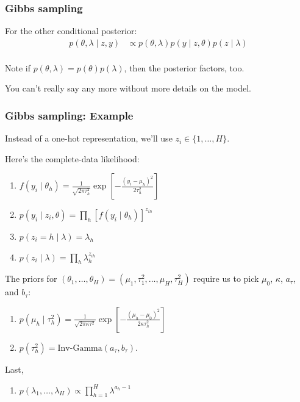 \documentclass{beamer}
\begin{document}
\begin{frame}
\frametitle{Gibbs sampling}

For the other conditional posterior:
\begin{align*}
p(\theta, \lambda \mid z, y) &\propto p(\theta, \lambda )p(y \mid z, \theta)p(z \mid \lambda) \\
\end{align*}

Note if $p(\theta, \lambda) = p(\theta)p(\lambda)$, then the posterior factors, too. 
\newline

You can't really say any more without more details on the model. 

\end{frame}

\begin{frame}
\frametitle{Gibbs sampling: Example}

Instead of a one-hot representation, we'll use $z_i \in \{1,\ldots,H\}$.
\newline
\pause



Here's the complete-data likelihood:

\begin{enumerate}
\item $f(y_i \mid \theta_h) = \frac{1}{\sqrt{2\pi \tau^2_{h} }}\exp\left[-\frac{(y_i - \mu_{h} )^2 }{ 2\tau^2_{h} } \right]$
\item $p(y_i \mid z_i, \theta) = \prod_{h} [f(y_i \mid \theta_h)]^{z_{ih}}$
\item $p(z_i = h \mid \lambda) = \lambda_h$
\item $p(z_i \mid \lambda) = \prod_h \lambda_h^{z_{ih}}$
\end{enumerate}
\pause

The priors for $(\theta_1, \ldots, \theta_H) = (\mu_1, \tau^2_1, \ldots, \mu_H, \tau^2_H)$ require us to pick $\mu_0$, $\kappa$, $a_{\tau}$, and $b_{\tau}$:
\begin{enumerate}
\item $p(\mu_h \mid \tau^2_{h}) = \frac{1}{\sqrt{2\pi \kappa \tau^2  }}\exp\left[-\frac{(\mu_{h} -  \mu_0)^2 }{ 2\kappa \tau_h^2 } \right]$
\item $p(\tau^2_{h}) = \text{Inv-Gamma}(a_{\tau}, b_{\tau})$.
\end{enumerate}
\pause

Last, 
\begin{enumerate}
\item $p(\lambda_1, \ldots, \lambda_H) \propto \prod_{h=1}^H \lambda^{a_h-1}$
\end{enumerate}

\end{frame}
\end{document}
